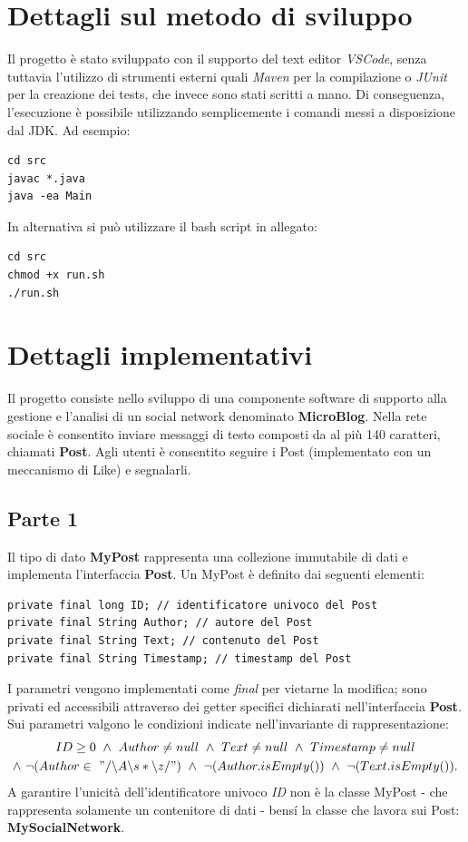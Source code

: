 \documentclass[10pt, italian, openany]{book}
\begin{document}
\section{Dettagli sul metodo di sviluppo}
Il progetto \`e stato sviluppato con il supporto del text editor \textit{VSCode}, senza tuttavia l'utilizzo di strumenti esterni quali \textit{Maven} per la compilazione o \textit{JUnit} per la creazione dei tests, che invece sono stati scritti a mano. Di conseguenza, l'esecuzione \`e possibile utilizzando semplicemente i comandi messi a disposizione dal JDK. Ad esempio:
\begin{lstlisting}[style=bash]
cd src
javac *.java
java -ea Main
\end{lstlisting}
In alternativa si pu\`o utilizzare il bash script in allegato:
\begin{lstlisting}[style=bash]
cd src
chmod +x run.sh
./run.sh
\end{lstlisting}

\section{Dettagli implementativi}
Il progetto consiste nello sviluppo di una componente software di supporto alla gestione e l'analisi di un social network denominato \textbf{MicroBlog}. Nella rete sociale \`e consentito inviare messaggi di testo composti da al pi\`u 140 caratteri, chiamati \textbf{Post}. Agli utenti \`e consentito seguire i Post (implementato con un meccanismo di Like) e segnalarli. 

\subsection{Parte 1}
Il tipo di dato \textbf{MyPost} rappresenta una collezione immutabile di dati e implementa l'interfaccia \textbf{Post}. Un MyPost \`e definito dai seguenti elementi:
\begin{lstlisting}[style=codeStyle]
private final long ID; // identificatore univoco del Post
private final String Author; // autore del Post
private final String Text; // contenuto del Post
private final String Timestamp; // timestamp del Post
\end{lstlisting}
I parametri vengono implementati come \textit{final} per vietarne la modifica; sono privati ed accessibili attraverso dei getter specifici dichiarati nell'interfaccia \textbf{Post}.
Sui parametri valgono le condizioni indicate nell'invariante di rappresentazione:
\begin{gather*}
    ID \geq 0 \ \wedge \ Author \neq null \ \wedge \ Text \neq null \ \wedge \ Timestamp \neq null \\
    \wedge \ \neg (Author \in \ "/\backslash A\backslash s*\backslash z/") \ \wedge \ \neg (Author.isEmpty())  \ \wedge \ \neg (Text.isEmpty()).
\end{gather*}
A garantire l'unicit\`a dell'identificatore univoco \textit{ID} non \`e la classe MyPost - che rappresenta solamente un contenitore di dati - bens\'i la classe che lavora sui Post: \textbf{MySocialNetwork}.
\end{document}

